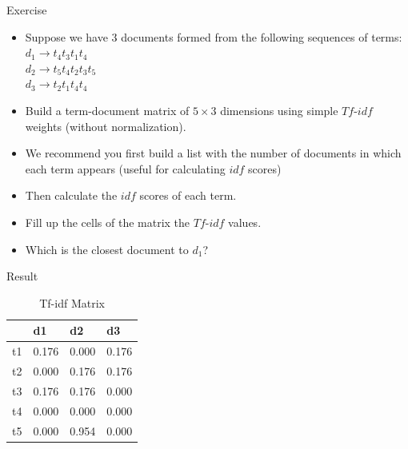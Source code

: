 \documentclass[handout]{beamer}
\begin{document}
\begin{frame}{Exercise}
\begin{itemize}
 \item Suppose we have $3$ documents formed from the following sequences of terms: \\
 $d_{1}\rightarrow t_{4}t_{3}t_{1}t_{4}$ \\
 $d_{2}\rightarrow t_{5}t_{4}t_{2}t_{3}t_{5}$ \\
 $d_{3}\rightarrow t_{2}t_{1}t_{4}t_{4}$ \\

\item Build a term-document matrix of $5\times3$ dimensions using simple $Tf$-$idf$ weights (without normalization).
\item  We recommend you first build a list with the number of documents in which each term appears (useful for calculating $idf$ scores) 
\item Then calculate the $idf$ scores of each term.
\item Fill up the cells of the matrix the $Tf$-$idf$ values.
\item Which is the closest document to $d_{1}$?
\end{itemize}


\end{frame}

\begin{frame}{Result}
 \begin{table}[htbp]
\caption{Tf-idf Matrix}
\begin{tabular}{|l|r|r|r|}
\hline
 & \multicolumn{1}{l|}{d1} & \multicolumn{1}{l|}{d2} & \multicolumn{1}{l|}{d3} \\ \hline
t1 & 0.176 & 0.000 & 0.176 \\ \hline
t2 & 0.000 & 0.176 & 0.176 \\ \hline
t3 & 0.176 & 0.176 & 0.000 \\ \hline
t4 & 0.000 & 0.000 & 0.000 \\ \hline
t5 & 0.000 & 0.954 & 0.000 \\ \hline
\end{tabular}
\end{table}

\end{frame}
\end{document}
